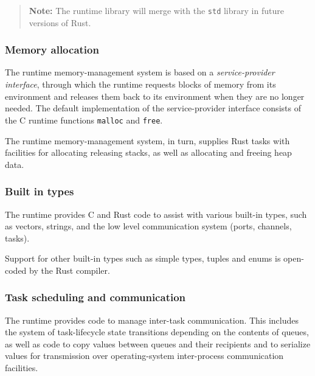 \documentclass[]{article}
\begin{document}
\begin{quote}
\textbf{Note:} The runtime library will merge with the \texttt{std}
library in future versions of Rust.
\end{quote}

\subsubsection{Memory allocation}\label{memory-allocation}

The runtime memory-management system is based on a
\emph{service-provider interface}, through which the runtime requests
blocks of memory from its environment and releases them back to its
environment when they are no longer needed. The default implementation
of the service-provider interface consists of the C runtime functions
\texttt{malloc} and \texttt{free}.

The runtime memory-management system, in turn, supplies Rust tasks with
facilities for allocating releasing stacks, as well as allocating and
freeing heap data.

\subsubsection{Built in types}\label{built-in-types}

The runtime provides C and Rust code to assist with various built-in
types, such as vectors, strings, and the low level communication system
(ports, channels, tasks).

Support for other built-in types such as simple types, tuples and enums
is open-coded by the Rust compiler.

\subsubsection{Task scheduling and
communication}\label{task-scheduling-and-communication}

The runtime provides code to manage inter-task communication. This
includes the system of task-lifecycle state transitions depending on the
contents of queues, as well as code to copy values between queues and
their recipients and to serialize values for transmission over
operating-system inter-process communication facilities.

\end{document}
